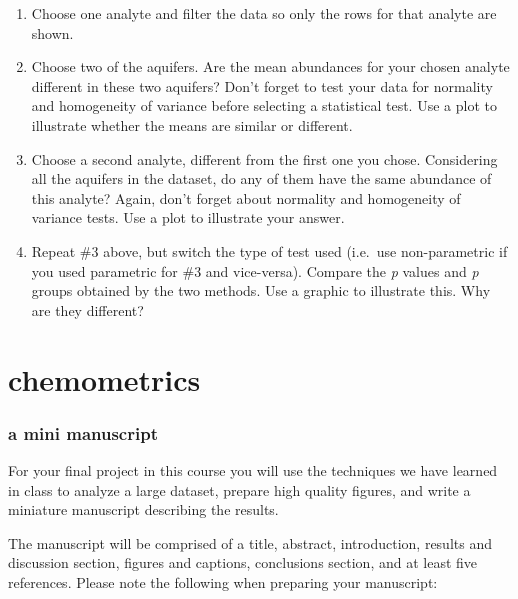 \documentclass[
]{krantz}
\begin{document}
\begin{enumerate}
\def\labelenumi{\arabic{enumi}.}
\item
  Choose one analyte and filter the data so only the rows for that analyte are shown.
\item
  Choose two of the aquifers. Are the mean abundances for your chosen analyte different in these two aquifers? Don't forget to test your data for normality and homogeneity of variance before selecting a statistical test. Use a plot to illustrate whether the means are similar or different.
\item
  Choose a second analyte, different from the first one you chose. Considering all the aquifers in the dataset, do any of them have the same abundance of this analyte? Again, don't forget about normality and homogeneity of variance tests. Use a plot to illustrate your answer.
\item
  Repeat \#3 above, but switch the type of test used (i.e.~use non-parametric if you used parametric for \#3 and vice-versa). Compare the \emph{p} values and \emph{p} groups obtained by the two methods. Use a graphic to illustrate this. Why are they different?
\end{enumerate}

\hypertarget{section-2}{%
\section*{}\label{section-2}}

\hypertarget{part-chemometrics-1}{%
\part{chemometrics}\label{part-chemometrics-1}}

\hypertarget{a-mini-manuscript}{%
\section*{a mini manuscript}\label{a-mini-manuscript}}

For your final project in this course you will use the techniques we have learned in class to analyze a large dataset, prepare high quality figures, and write a miniature manuscript describing the results.

The manuscript will be comprised of a title, abstract, introduction, results and discussion section, figures and captions, conclusions section, and at least five references. Please note the following when preparing your manuscript:
\end{document}
